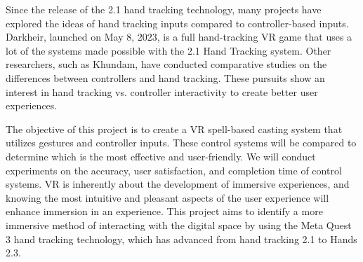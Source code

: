\documentclass[acmlarge]{acmart}
\begin{document}
Since the release of the 2.1 hand tracking technology, many projects have explored the ideas of hand tracking inputs compared to controller-based inputs. Darkheir, launched on May 8, 2023, is a full hand-tracking VR game that uses a lot of the systems made possible with the 2.1 Hand Tracking system. Other researchers, such as Khundam, have conducted comparative studies on the differences between controllers and hand tracking. These pursuits show an interest in hand tracking vs. controller interactivity to create better user experiences.

The objective of this project is to create a VR spell-based casting system that utilizes gestures and controller inputs. These control systems will be compared to determine which is the most effective and user-friendly. We will conduct experiments on the accuracy, user satisfaction, and completion time of control systems. VR is inherently about the development of immersive experiences, and knowing the most intuitive and pleasant aspects of the user experience will enhance immersion in an experience. This project aims to identify a more immersive method of interacting with the digital space by using the Meta Quest 3 hand tracking technology, which has advanced from hand tracking 2.1 to Hands 2.3\cite{Meta_2024}.





\end{document}

